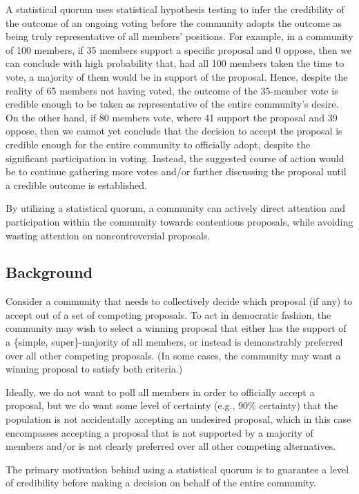 \documentclass[format=acmsmall, review=true, screen=true, anonymous=true]{acmart}
\begin{document}
A statistical quorum uses statistical hypothesis testing to infer the credibility of the outcome
of an ongoing voting before the community adopts the outcome as being truly representative of all
members' positions.
For example, in a community of 100 members, if 35 members support a specific proposal and 0 oppose,
then we can conclude with high probability that, had all 100 members taken the time to vote, a
majority of them would be in support of the proposal.
Hence, despite the reality of 65 members not having voted, the outcome of the 35-member vote is
credible enough to be taken as representative of the entire community's desire.
On the other hand, if 80 members vote, where 41 support the proposal and 39 oppose, then we
cannot yet conclude that the decision to accept the proposal is credible enough for the entire
community to officially adopt, despite the significant participation in voting.
Instead, the suggested course of action would be to continue gathering more votes and/or further
discussing the proposal until a credible outcome is established.

By utilizing a statistical quorum, a community can actively direct attention and participation
within the community towards contentious proposals, while avoiding wasting attention on
noncontroversial proposals.

\subsection{Background}
Consider a community that needs to collectively decide which proposal (if any) to accept out of
a set of competing proposals.
To act in democratic fashion, the community may wish to select a winning proposal that either has
the support of a \{simple, super\}-majority of all members, or instead is demonstrably preferred
over all other competing proposals.
(In some cases, the community may want a winning proposal to satisfy both criteria.)

Ideally, we do not want to poll all members in order to officially accept a proposal, but we do
want some level of certainty (e.g., $90\%$ certainty) that the population is not accidentally
accepting an undesired proposal, which in this case encompasses accepting a proposal that is
not supported by a majority of members and/or is not clearly preferred over all other competing
alternatives.

The primary motivation behind using a statistical quorum is to guarantee a level of credibility
before making a decision on behalf of the entire community.
\end{document}
